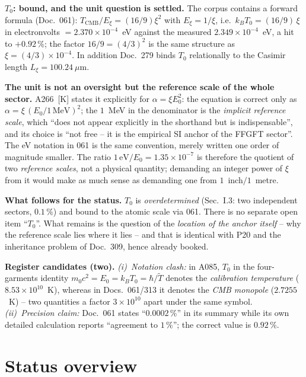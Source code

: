 \documentclass[11pt]{report}
\begin{document}
\textbf{$T_0$: bound, and the unit question is settled.} The corpus
contains a forward formula (Doc.~061):
$T_\text{CMB}/E_\xi = (16/9)\xi^2$ with $E_\xi = 1/\xi$, i.e.\
$k_BT_0 = (16/9)\,\xi$ in electronvolts $= 2.370\times10^{-4}$~eV
against the measured $2.349\times10^{-4}$~eV, a hit to
$+0.92\,\%$; the factor $16/9 = (4/3)^2$ is the same structure as
$\xi = (4/3)\times10^{-4}$. In addition Doc.~279 binds $T_0$
relationally to the Casimir length $L_\xi = 100.24~\mu$m.

\textbf{The unit is not an oversight but the reference scale of the
whole sector.} A266~[K] states it explicitly for
$\alpha = \xi E_0^2$: the equation is correct only as
$\alpha = \xi\,(E_0/1\,\text{MeV})^2$; the $1$~MeV in the
denominator is the \emph{implicit reference scale}, which
\enquote{does not appear explicitly in the shorthand but is
indispensable}, and its choice is \enquote{not free -- it is the
empirical SI anchor of the FFGFT sector}. The eV notation in 061 is
the same convention, merely written one order of magnitude smaller.
The ratio $1\,\text{eV}/E_0 = 1.35\times10^{-7}$ is therefore the
quotient of two \emph{reference scales}, not a physical quantity;
demanding an integer power of $\xi$ from it would make as much
sense as demanding one from $1$~inch$/1$~metre.

\textbf{What follows for the status.} $T_0$ is
\emph{overdetermined} (Sec.~I.3: two independent sectors,
$0.1\,\%$) and bound to the atomic scale via 061. There is no
separate open item \enquote{$T_0$}. What remains is the question of
the \emph{location of the anchor itself} -- why the reference scale
lies where it lies -- and that is identical with P20 and the
inheritance problem of Doc.~309, hence already booked.

\textbf{Register candidates (two).} \emph{(i)~Notation clash:} in
A085, $T_0$ in the four-garments identity
$m_0c^2 = E_0 = k_BT_0 = \hbar/\tilde T$ denotes the
\emph{calibration temperature} ($8.53\times10^{10}$~K), whereas in
Docs.~061/313 it denotes the \emph{CMB monopole} ($2.7255$~K) --
two quantities a factor $3\times10^{10}$ apart under the same
symbol. \emph{(ii)~Precision claim:} Doc.~061 states
\enquote{$0.0002\,\%$} in its summary while its own detailed
calculation reports \enquote{agreement to $1\,\%$}; the correct
value is $0.92\,\%$.

\chapter{Status overview}
\end{document}
